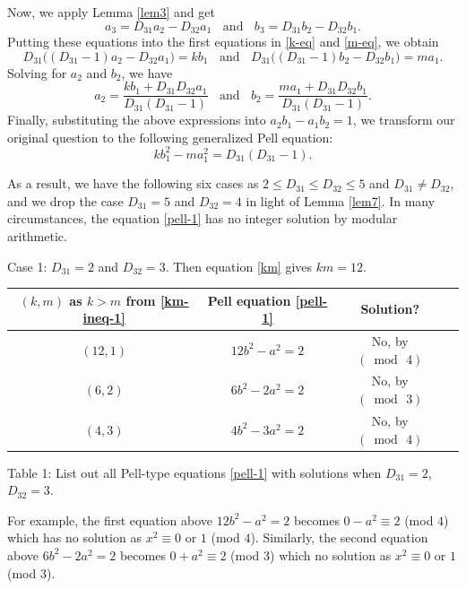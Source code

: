 \documentclass[12pt]{article}
\begin{document}
Now, we apply Lemma \ref{lem3} and get
\begin{equation*}
a_3 = D_{31} a_2 - D_{32} a_1 \; \; \text{ and } \; \; b_3 = D_{31} b_2 - D_{32} b_1.
\end{equation*}
Putting these equations into the first equations in \eqref{k-eq} and \eqref{m-eq}, we obtain
\[
D_{31} \bigl( (D_{31} - 1) a_2 - D_{32} a_1 \bigr) = k b_1 \; \; \text{ and } \; \; D_{31} \bigl( (D_{31} - 1) b_2 - D_{32} b_1 \bigr)= m a_1.
\]
Solving for $a_2$ and $b_2$, we have
\[
a_2 = \frac{k b_1 + D_{31} D_{32} a_1}{D_{31} (D_{31} - 1)} \; \; \text{ and } \; \; b_2 = \frac{m a_1 + D_{31} D_{32} b_1}{D_{31} (D_{31} - 1)}.
\]
Finally, substituting the above expressions into $a_2 b_1 - a_1 b_2 = 1$, we transform our original question to the following generalized Pell equation:
\begin{equation} \label{pell-1}
k b_1^2 - m a_1^2 = D_{31} (D_{31} - 1).
\end{equation}


As a result, we have the following six cases as $2 \le D_{31} \le D_{32} \le 5$ and $D_{31} \neq D_{32}$, and we drop the case $D_{31} = 5$ and $D_{32} = 4$ in light of Lemma \ref{lem7}. In many circumstances, the equation \eqref{pell-1} has no integer solution by modular arithmetic.

\bigskip

Case 1: $D_{31} = 2$ and $D_{32} = 3$. Then equation \eqref{km} gives $k m = 12$.

\begin{center}
\begin{tabular}{|c|c|c|c|}
\hline $(k, m)$ as $k > m$ from \eqref{km-ineq-1} & Pell equation \eqref{pell-1} & Solution? \\
\hline $(12,1)$ & $12b^2-a^2=2$ & No, by $(\bmod \, 4)$\\
\hline $(6,2)$ & $6b^2-2a^2=2$ & No, by $(\bmod \, 3)$\\
\hline $(4,3)$ & $4b^2-3a^2=2$ & No, by $(\bmod \, 4)$\\
\hline
\end{tabular}
\newline \small{Table 1: List out all Pell-type equations \eqref{pell-1} with solutions when $D_{31} = 2$, $D_{32} = 3$.}
\end{center}


\noindent For example, the first equation above $12 b^2 - a^2 = 2$ becomes $0 - a^2 \equiv 2$ (mod $4$) which has no solution as $x^2 \equiv 0$ or $1$ (mod $4$). Similarly, the second equation above $6 b^2 - 2 a^2 = 2$ becomes $0 + a^2 \equiv 2$ (mod $3$) which no solution as $x^2 \equiv 0$ or $1$ (mod $3$).
\end{document}
